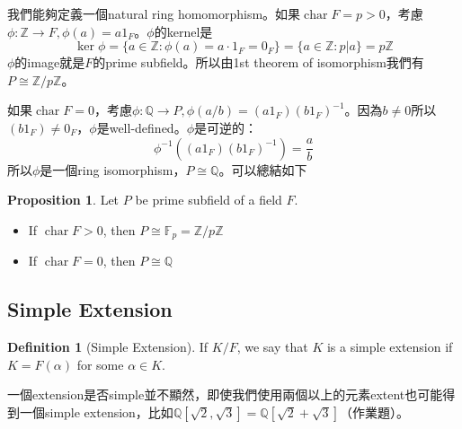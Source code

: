 \documentclass[12pt]{article}
\theoremstyle{definition}
\newtheorem{dfn}{Definition}
\newtheorem{prop}{Proposition}
\newenvironment{proofs}[1][\proofname]{%
  \begin{proof}[#1]$ $\par\nobreak\ignorespaces
}{%
  \end{proof}
}
\newcommand{\FF}{\mathbb F}
\newcommand{\QQ}{\mathbb Q}
\newcommand{\ZZ}{\mathbb Z}
\DeclareMathOperator{\Char}{char}
\begin{document}
我們能夠定義一個natural ring homomorphism。如果$\Char F = p > 0 $，考慮$\phi:\ZZ\to F, \phi(a)=a1_F$。$\phi$的kernel是
\[
	\ker \phi = \{a\in\ZZ: \phi(a)=a\cdot 1_F =0_F\}=\{a\in \ZZ: p|a\}=p\ZZ
\]
$\phi$的image就是$F$的prime subfield。所以由1st theorem of isomorphism我們有$P\cong \ZZ/p\ZZ$。

如果$\Char F = 0 $，考慮$\phi:\QQ\to P, \phi(a/b)=(a1_F)(b1_F)^{-1}$。因為$b\neq0$所以$(b1_F)\neq 0_F$，$\phi$是well-defined。$\phi$是可逆的：
\[
	\phi^{-1}((a1_F)(b1_F)^{-1})=\frac{a}{b}
\]
所以$\phi$是一個ring isomorphism，$P\cong \QQ$。可以總結如下

\begin{prop}
	Let $P$ be prime subfield of a field $F$.
	\begin{itemize}
		\item If $\Char F>0$, then $P\cong \FF_p = \ZZ/p\ZZ$
		\item If $\Char F=0$, then $P\cong \QQ$
	\end{itemize}
\end{prop}











\subsection{Simple Extension}

\begin{dfn}[Simple Extension]
	If $K/F$, we say that $K$ is a simple extension if $K=F(\alpha)$ for some $\alpha \in K$.
\end{dfn}
一個extension是否simple並不顯然，即使我們使用兩個以上的元素extent也可能得到一個simple extension，比如$\QQ[\sqrt{2},\sqrt{3}]=\QQ[\sqrt{2}+\sqrt{3}]$（作業題）。
\end{document}

